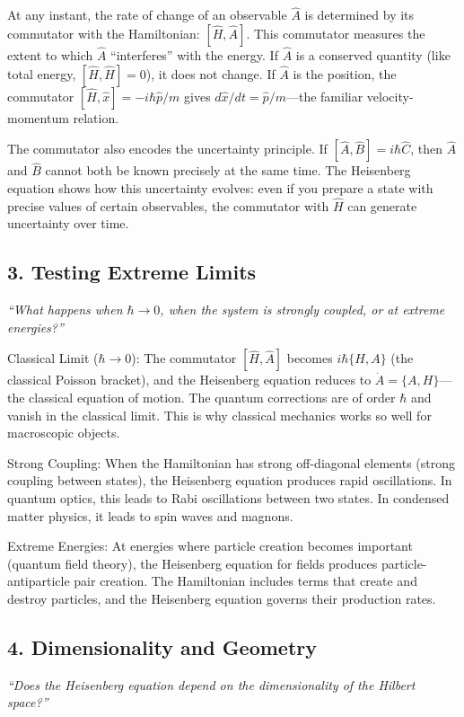 \documentclass[11pt,openright]{book}
\begin{document}
At any instant, the rate of change of an observable $\hat{A}$ is determined by its commutator with the Hamiltonian: $[\hat{H}, \hat{A}]$. This commutator measures the extent to which $\hat{A}$ ``interferes'' with the energy. If $\hat{A}$ is a conserved quantity (like total energy, $[\hat{H}, \hat{H}] = 0$), it does not change. If $\hat{A}$ is the position, the commutator $[\hat{H}, \hat{x}] = -i\hbar\hat{p}/m$ gives $d\hat{x}/dt = \hat{p}/m$---the familiar velocity-momentum relation.

The commutator also encodes the uncertainty principle. If $[\hat{A}, \hat{B}] = i\hbar\hat{C}$, then $\hat{A}$ and $\hat{B}$ cannot both be known precisely at the same time. The Heisenberg equation shows how this uncertainty evolves: even if you prepare a state with precise values of certain observables, the commutator with $\hat{H}$ can generate uncertainty over time.

\subsection*{3. Testing Extreme Limits}
\textit{``What happens when $\hbar \to 0$, when the system is strongly coupled, or at extreme energies?''}

Classical Limit ($\hbar \to 0$): The commutator $[\hat{H}, \hat{A}]$ becomes $i\hbar\{H, A\}$ (the classical Poisson bracket), and the Heisenberg equation reduces to $\dot{A} = \{A, H\}$---the classical equation of motion. The quantum corrections are of order $\hbar$ and vanish in the classical limit. This is why classical mechanics works so well for macroscopic objects.

Strong Coupling: When the Hamiltonian has strong off-diagonal elements (strong coupling between states), the Heisenberg equation produces rapid oscillations. In quantum optics, this leads to Rabi oscillations between two states. In condensed matter physics, it leads to spin waves and magnons.

Extreme Energies: At energies where particle creation becomes important (quantum field theory), the Heisenberg equation for fields produces particle-antiparticle pair creation. The Hamiltonian includes terms that create and destroy particles, and the Heisenberg equation governs their production rates.

\subsection*{4. Dimensionality and Geometry}
\textit{``Does the Heisenberg equation depend on the dimensionality of the Hilbert space?''}
\end{document}
